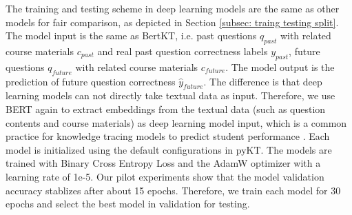 The training and testing scheme in deep learning models are the same as other models for fair comparison, as depicted in Section \ref{subsec: traing testing split}. The model input is the same as BertKT, i.e. past questions $q_{past}$ with related course materials $c_{past}$ and real past question correctness labels $y_{past}$, future questions $q_{future}$ with related course materials $c_{future}$. The model output is the prediction of future question correctness $\hat{y}_{future}$. The difference is that deep learning models can not directly take textual data as input. Therefore, we use BERT again to extract embeddings from the textual data (such as question contents and course materials) as deep learning model input, which is a common practice for knowledge tracing models to predict student performance \cite{DBLP:conf/iclr/0001L0H023}.
Each model is initialized using the default configurations in pyKT. The models are trained with Binary Cross Entropy Loss and the AdamW optimizer with a learning rate of 1e-5. Our pilot experiments show that the model validation accuracy stablizes after about 15 epochs. Therefore, we train each model for 30 epochs and select the best model in validation for testing.













